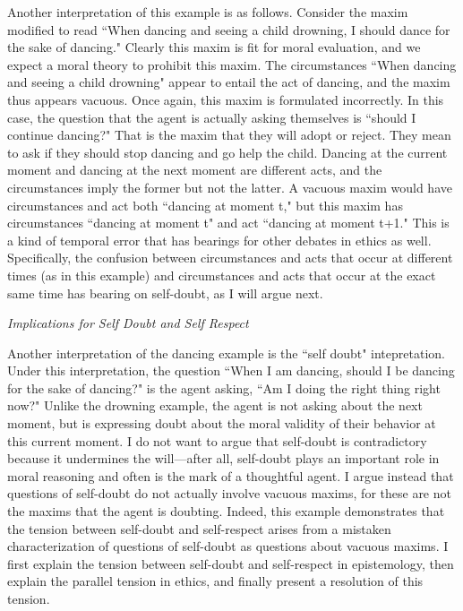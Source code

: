 \begin{isabellebody}
\begin{isamarkuptext}
Another interpretation of this example is as follows. Consider the maxim modified to 
read ``When dancing and seeing a child drowning, I should dance for the sake of dancing." Clearly this 
maxim is fit for moral evaluation, and we expect a moral theory to prohibit this maxim. The circumstances 
``When dancing and seeing a child drowning" appear to entail the act of dancing, and the maxim thus 
appears vacuous. Once again, this maxim is formulated incorrectly. In this case, the question 
that the agent is actually asking themselves is ``should I continue dancing?" That is the 
maxim that they will adopt or reject. They mean to ask if they should stop dancing and go help the child. 
Dancing at the current moment and dancing at the next moment are different acts, and the circumstances 
imply the former but not the latter. A vacuous maxim would have circumstances and act both 
``dancing at moment t," but this maxim has circumstances ``dancing at moment t" and act ``dancing 
at moment t+1." This is a kind of temporal error that has bearings for other debates in ethics as well. 
Specifically, the confusion between circumstances and acts that occur at different times (as in this example) and circumstances 
and acts that occur at the exact same time has bearing on self-doubt, as I will argue next.


\emph{Implications for Self Doubt and Self Respect}

Another interpretation of the dancing example is the ``self doubt" intepretation. Under this 
interpretation, the question ``When I am dancing, 
should I be dancing for the sake of dancing?" is the agent asking, ``Am I doing the right thing 
right now?" Unlike the drowning example, the agent is not asking about the next moment, but is expressing doubt about the 
moral validity of their behavior at this current moment. I do not want to argue that self-doubt is 
contradictory because it undermines the will—after all, self-doubt plays an important role in moral 
reasoning and often is the mark of a thoughtful agent. I argue instead that questions of self-doubt
do not actually involve vacuous maxims, for these are not the maxims that the agent is doubting. Indeed,
this example demonstrates that the tension between self-doubt and self-respect arises from a 
mistaken characterization of questions of self-doubt as questions about vacuous maxims.
I first explain the tension between self-doubt and self-respect in epistemology, then 
explain the parallel tension in ethics, and finally present a resolution of this tension.


\end{isamarkuptext}
\end{isabellebody}
